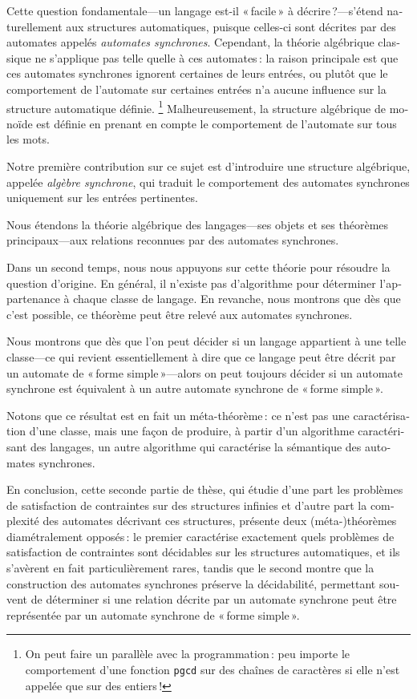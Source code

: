 \begin{french}
Cette question fondamentale---un langage est-il « facile » à décrire ?---s'étend
naturellement aux structures automatiques, puisque celles-ci sont décrites par
des automates appelés \emph{automates synchrones}.
Cependant, la théorie algébrique classique ne s'applique pas telle quelle
à ces automates : la raison principale est que ces automates synchrones ignorent
certaines de leurs entrées, ou plutôt que le comportement de l'automate
sur certaines entrées n'a aucune influence sur la structure automatique définie.%
\footnote[][-3cm]{On peut faire un parallèle avec la programmation : peu importe le comportement d'une fonction \texttt{pgcd} sur des chaînes de caractères si elle n'est appelée que sur des entiers !}
Malheureusement, la structure algébrique de monoïde est définie en prenant en compte
le comportement de l'automate sur tous les mots.

Notre première contribution sur ce sujet est d'introduire une structure algébrique, appelée
\emph{algèbre synchrone}, qui traduit le comportement des automates synchrones uniquement sur les
entrées pertinentes.

\begin{contribution}
	Nous étendons la théorie algébrique des langages---ses objets et ses théorèmes principaux---aux relations reconnues par des automates synchrones.
\end{contribution}

Dans un second temps, nous nous appuyons sur cette théorie pour résoudre la question d'origine.
En général, il n'existe pas d'algorithme pour déterminer l'appartenance à chaque classe de langage.
En revanche, nous montrons que dès que c'est possible, ce théorème peut être relevé aux
automates synchrones.

\begin{contribution}
	Nous montrons que dès que l'on peut décider si un langage appartient à une telle 
	classe---ce qui revient essentiellement à dire que ce langage peut être décrit par un automate 
	de « forme simple »---alors on peut toujours décider si un automate synchrone est équivalent à un autre automate synchrone de « forme simple ».
\end{contribution}

Notons que ce résultat est en fait un méta-théorème : ce n'est pas une caractérisation d'une classe,
mais une façon de produire, à partir d'un algorithme caractérisant des langages, un autre 
algorithme qui caractérise la sémantique des automates synchrones.

En conclusion, cette seconde partie de thèse, qui étudie d'une part
les problèmes de satisfaction de contraintes sur des structures infinies et d'autre part la complexité des
automates décrivant ces structures, présente deux (méta-)théorèmes diamétralement opposés : le 
premier caractérise exactement quels problèmes de satisfaction de contraintes sont décidables
sur les structures automatiques, et ils s'avèrent en fait particulièrement rares,
tandis que le second montre que la construction des automates synchrones préserve la 
décidabilité, permettant souvent de déterminer si une relation décrite par
un automate synchrone peut être représentée par un automate synchrone de « forme simple ».
\end{french}